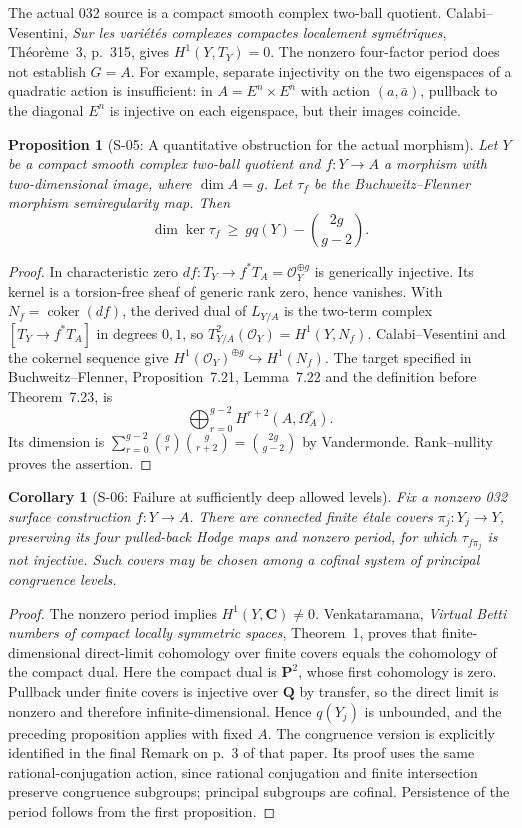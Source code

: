\documentclass[11pt,a4paper]{article}
\newtheorem{proposition}[theorem]{Proposition}
\newtheorem{corollary}[theorem]{Corollary}
\theoremstyle{definition}
\begin{document}
The actual 032 source is a compact smooth complex two-ball quotient.
Calabi--Vesentini, \emph{Sur les vari\'et\'es complexes compactes
localement sym\'etriques}, Th\'eor\`eme~3, p.~315, gives
$H^1(Y,T_Y)=0$. The nonzero four-factor period does not establish
$G=A$. For example, separate injectivity on the two eigenspaces
of a quadratic action is insufficient: in
$A=E^n\times E^n$ with action $(a,\bar a)$, pullback to the diagonal
$E^n$ is injective on each eigenspace, but their images coincide.

\begin{proposition}[S-05: A quantitative obstruction for the actual morphism]
\label{prop:semireg-map-dimension}
Let $Y$ be a compact smooth complex two-ball quotient and
$f:Y\to A$ a morphism with two-dimensional image, where $\dim A=g$.
Let $\tau_f$ be the Buchweitz--Flenner morphism semiregularity map.
Then
\[
 \dim\ker\tau_f\ \geq\ gq(Y)-\binom{2g}{g-2}.
\]
\end{proposition}
\begin{proof}
In characteristic zero $df:T_Y\to f^*T_A=\mathcal O_Y^{\oplus g}$
is generically injective. Its kernel is a torsion-free sheaf of
generic rank zero, hence vanishes. With $N_f=\operatorname{coker}(df)$,
the derived dual of $L_{Y/A}$ is the two-term complex
$[T_Y\to f^*T_A]$ in degrees $0,1$, so
$T^2_{Y/A}(\mathcal O_Y)=H^1(Y,N_f)$.
Calabi--Vesentini and the cokernel sequence give
$H^1(\mathcal O_Y)^{\oplus g}\hookrightarrow H^1(N_f)$.
The target specified in Buchweitz--Flenner, Proposition~7.21,
Lemma~7.22 and the definition before Theorem~7.23, is
\[
 \bigoplus_{r=0}^{g-2}H^{r+2}(A,\Omega_A^r).
\]
Its dimension is
$\sum_{r=0}^{g-2}\binom gr\binom g{r+2}=\binom{2g}{g-2}$
by Vandermonde. Rank--nullity proves the assertion.
\end{proof}

\begin{corollary}[S-06: Failure at sufficiently deep allowed levels]
\label{cor:semireg-level-failure}
Fix a nonzero 032 surface construction $f:Y\to A$. There are
connected finite \'etale covers $\pi_j:Y_j\to Y$, preserving its
four pulled-back Hodge maps and nonzero period, for which
$\tau_{f\pi_j}$ is not injective. Such covers may be chosen among
a cofinal system of principal congruence levels.
\end{corollary}
\begin{proof}
The nonzero period implies $H^1(Y,\mathbf C)\ne0$.
Venkataramana, \emph{Virtual Betti numbers of compact locally
symmetric spaces}, Theorem~1, proves that finite-dimensional
direct-limit cohomology over finite covers equals the cohomology
of the compact dual. Here the compact dual is $\mathbf P^2$,
whose first cohomology is zero. Pullback under finite covers is
injective over $\mathbf Q$ by transfer, so the direct limit is
nonzero and therefore infinite-dimensional. Hence $q(Y_j)$ is
unbounded, and the preceding proposition applies with fixed $A$.
The congruence version is explicitly identified in the final Remark
on p.~3 of that paper. Its proof uses the same rational-conjugation
action, since rational conjugation and finite intersection preserve
congruence subgroups; principal subgroups are cofinal.
Persistence of the period follows from the first proposition.
\end{proof}
\end{document}
